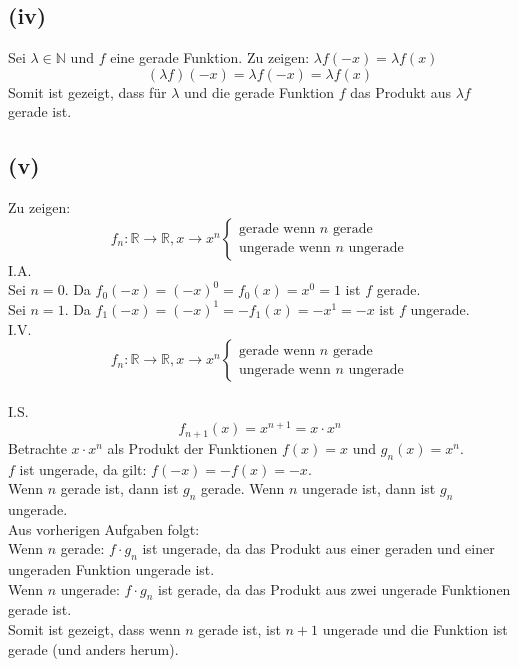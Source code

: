 \documentclass{article}
\begin{document}
\subsection{(iv)}
Sei $\lambda \in \mathbb{N}$ und $f$ eine gerade Funktion. Zu zeigen: $\lambda f(-x) = \lambda f(x)$
\[(\lambda f)(-x) = \lambda f (-x) = \lambda f (x)\]
Somit ist gezeigt, dass für $\lambda$ und die gerade Funktion $f$ das Produkt aus $\lambda f$ gerade ist.

\subsection{(v)}
Zu zeigen: \[f_n: \mathbb{R} \to \mathbb{R}, x \to x^n \begin{cases}
    \text{gerade wenn } n \text{ gerade} \\
    \text{ungerade wenn } n \text{ ungerade}
\end{cases}\]
I.A. \\
Sei $n = 0$. Da $f_0(-x) = (-x)^0 = f_0(x) = x^0 = 1$ ist $f$ gerade. \\
\newline
Sei $n = 1$. Da $f_1(-x) = (-x)^1 = -f_1(x) = -x^1 = -x$ ist $f$ ungerade. \\
\newline
I.V. \[f_n: \mathbb{R} \to \mathbb{R}, x \to x^n \begin{cases}
    \text{gerade wenn } n \text{ gerade} \\
    \text{ungerade wenn } n \text{ ungerade}
\end{cases}\] \\
\newline
I.S. \\
\[f_{n+1}(x) = x^{n+1} = x \cdot x^n\]
Betrachte $x \cdot x^n$ als Produkt der Funktionen $f(x) = x$ und $g_n(x)=x^n$. \\
$f$ ist ungerade, da gilt: $f(-x) = -f(x) = -x$. \\
Wenn $n$ gerade ist, dann ist $g_n$ gerade. Wenn $n$ ungerade ist, dann ist $g_n$ ungerade. \\
Aus vorherigen Aufgaben folgt: \\
Wenn $n$ gerade: $f \cdot g_n$ ist ungerade, da das Produkt aus einer geraden und einer ungeraden Funktion ungerade ist. \\
Wenn $n$ ungerade: $f \cdot g_n$ ist gerade, da das Produkt aus zwei ungerade Funktionen gerade ist. \\
Somit ist gezeigt, dass wenn $n$ gerade ist, ist $n+1$ ungerade und die Funktion ist gerade (und anders herum). \\
\end{document}
